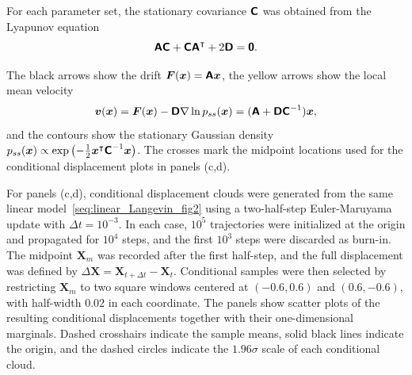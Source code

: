 For each parameter set, the stationary covariance $\boldsymbol{\mathsf{C}}$ was obtained from the Lyapunov equation
\begin{equation}
    \boldsymbol{\mathsf{A}}\boldsymbol{\mathsf{C}}+\boldsymbol{\mathsf{C}}\boldsymbol{\mathsf{A}}^\intercal+2\boldsymbol{\mathsf{D}}=\boldsymbol{\mathsf{0}}.
    \label{seq:lyapunov_equation}
\end{equation}

The black arrows show the drift $\bm F(\bm x)=\boldsymbol{\mathsf{A}}\bm x$, the yellow arrows show the local mean velocity
\begin{equation}
    \bm v(\bm x)=\bm F(\bm x)-\boldsymbol{\mathsf{D}}\nabla\ln p_{ss}(\bm x)
    =(\boldsymbol{\mathsf{A}}+\boldsymbol{\mathsf{D}}\boldsymbol{\mathsf{C}}^{-1})\bm x,
    \label{seq:cal_v_linear}
\end{equation}
and the contours show the stationary Gaussian density $p_{ss}(\bm x)\propto\exp\left(-\frac{1}{2}\bm x^\intercal\boldsymbol{\mathsf{C}}^{-1}\bm x\right)$.
The crosses mark the midpoint locations used for the conditional displacement plots in panels (c,d).

For panels (c,d), conditional displacement clouds were generated from the same linear model~\eqref{seq:linear_Langevin_fig2} using a two-half-step Euler-Maruyama update with $\Delta t=10^{-3}$. In each case, $10^5$ trajectories were initialized at the origin and propagated for $10^4$ steps, and the first $10^3$ steps were discarded as burn-in. The midpoint $\bm X_m$ was recorded after the first half-step, and the full displacement was defined by $\Delta\bm X=\bm X_{t+\Delta t}-\bm X_t$. Conditional samples were then selected by restricting $\bm X_m$ to two square windows centered at $(-0.6,0.6)$ and $(0.6,-0.6)$, with half-width $0.02$ in each coordinate. The panels show scatter plots of the resulting conditional displacements together with their one-dimensional marginals. Dashed crosshairs indicate the sample means, solid black lines indicate the origin, and the dashed circles indicate the $1.96\sigma$ scale of each conditional cloud.

